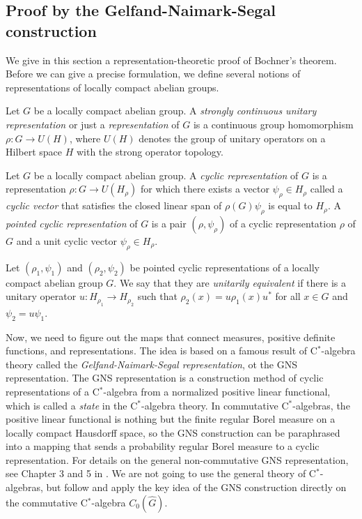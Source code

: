 \documentclass[a4paper]{article}
\begin{document}
\subsection{Proof by the Gelfand-Naimark-Segal construction}

We give in this section a representation-theoretic proof of Bochner's theorem.
Before we can give a precise formulation, we define several notions of representations of locally compact abelian groups.

\begin{defn}
Let $G$ be a locally compact abelian group.
A \emph{strongly continuous unitary representation} or just a \emph{representation} of $G$ is a continuous group homomorphism $\rho:G\to U(H)$, where $U(H)$ denotes the group of unitary operators on a Hilbert space $H$ with the strong operator topology.
\end{defn}

\begin{defn}
Let $G$ be a locally compact abelian group.
A \emph{cyclic representation} of $G$ is a representation $\rho:G\to U(H_\rho)$ for which there exists a vector $\psi_\rho\in H_\rho$ called a \emph{cyclic vector} that satisfies the closed linear span of $\rho(G)\psi_\rho$ is equal to $H_\rho$.
A \emph{pointed cyclic representation} of $G$ is a pair $(\rho,\psi_\rho)$ of a cyclic representation $\rho$ of $G$ and a unit cyclic vector $\psi_\rho\in H_\rho$.
\end{defn}

\begin{defn}
Let $(\rho_1,\psi_1)$ and $(\rho_2,\psi_2)$ be pointed cyclic representations of a locally compact abelian group $G$.
We say that they are \emph{unitarily equivalent} if there is a unitary operator $u:H_{\rho_1}\to H_{\rho_2}$ such that $\rho_2(x)=u\rho_1(x)u^*$ for all $x\in G$ and $\psi_2=u\psi_1$.
\end{defn}

Now, we need to figure out the maps that connect measures, positive definite functions, and representations.
The idea is based on a famous result of C$^*$-algebra theory called the \emph{Gelfand-Naimark-Segal representation}, ot the GNS representation.
The GNS representation is a construction method of cyclic representations of a C$^*$-algebra from a normalized positive linear functional, which is called a \emph{state} in the C$^*$-algebra theory.
In commutative C$^*$-algebras, the positive linear functional is nothing but the finite regular Borel measure on a locally compact Hausdorff space, so the GNS construction can be paraphrased into a mapping that sends a probability regular Borel measure to a cyclic representation.
For details on the general non-commutative GNS representation, see Chapter 3 and 5 in \cite{murphy2014c}.
We are not going to use the general theory of C$^*$-algebras, but follow and apply the key idea of the GNS construction directly on the commutative C$^*$-algebra $C_0(\hat G)$.
\end{document}
